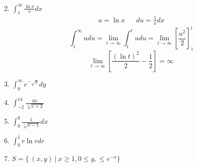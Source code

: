\documentclass[12pt]{article}
\begin{document}
\begin{enumerate}
\begin{align*}
        \end{align*}\newpage
    \addtocounter{enumi}{3}\item $\int^\infty_1\frac{\ln{x}}{x}dx$
        \begin{align*}
            u = \ln{x} && du = \frac{1}{x}dx
        \end{align*}
        \begin{equation*}
            \int^\infty_1 udu = \lim_{t\to\infty}\int^t_1udu = \lim_{t\to\infty}\left[\frac{u^2}{2}\right]_1^t
        \end{equation*}
        \begin{equation*}
            \lim_{t\to\infty}\left[\frac{(\ln{t})^2}{2}-\frac{1}{2}\right] = \infty
        \end{equation*}
    \addtocounter{enumi}{3}\item $\int^\infty_0e^{-\sqrt{y}}dy$
    \addtocounter{enumi}{3}\item $\int^{14}_{-2}\frac{dx}{\sqrt[4]{x+2}}$    
    \addtocounter{enumi}{3}\item $\int_0^9\frac{1}{\sqrt[3]{x-1}}dx$
    \addtocounter{enumi}{3}\item $\int_0^1r\ln{r}dr$
    \addtocounter{enumi}{3}\item $S=\{\ (x,y) \  | \ x \geq 1, 0 \leq y, \leq e^{-x}\}$
\end{enumerate}

 
 
\end{document}
